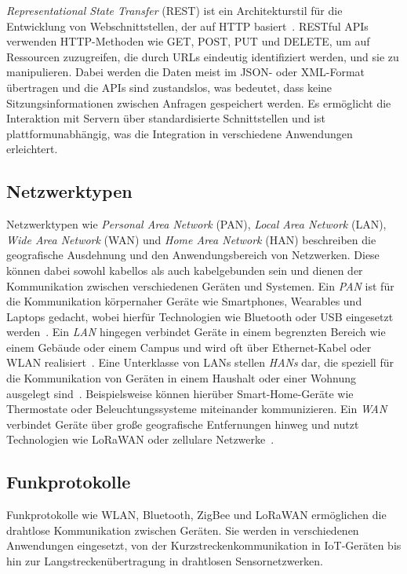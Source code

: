 \emph{Representational State Transfer} (REST) ist ein Architekturstil für die Entwicklung von Webschnittstellen, der auf HTTP basiert~\cite{REST}.
RESTful APIs verwenden HTTP-Methoden wie GET, POST, PUT und DELETE, um auf Ressourcen zuzugreifen, die durch URLs eindeutig identifiziert werden, und sie zu manipulieren.
Dabei werden die Daten meist im JSON- oder XML-Format übertragen und die APIs sind zustandslos, was bedeutet, dass keine Sitzungsinformationen zwischen Anfragen gespeichert werden.
Es ermöglicht die Interaktion mit Servern über standardisierte Schnittstellen und ist plattformunabhängig, was die Integration in verschiedene Anwendungen erleichtert.


\subsection*{Netzwerktypen}
Netzwerktypen wie \emph{Personal Area Network} (PAN), \emph{Local Area Network} (LAN), \emph{Wide Area Network} (WAN) und \emph{Home Area Network} (HAN) beschreiben die geografische Ausdehnung und den Anwendungsbereich von Netzwerken.
Diese können dabei sowohl kabellos als auch kabelgebunden sein und dienen der Kommunikation zwischen verschiedenen Geräten und Systemen.
Ein \emph{PAN} ist für die Kommunikation körpernaher Geräte wie Smartphones, Wearables und Laptops gedacht, wobei hierfür Technologien wie Bluetooth oder USB eingesetzt werden~\cite{PAN}.
Ein \emph{LAN} hingegen verbindet Geräte in einem begrenzten Bereich wie einem Gebäude oder einem Campus und wird oft über Ethernet-Kabel oder WLAN realisiert~\cite{LAN}.
Eine Unterklasse von LANs stellen \emph{HANs} dar, die speziell für die Kommunikation von Geräten in einem Haushalt oder einer Wohnung ausgelegt sind~\cite{HAN}.
Beispielsweise können hierüber Smart-Home-Geräte wie Thermostate oder Beleuchtungssysteme miteinander kommunizieren.
Ein \emph{WAN} verbindet Geräte über große geografische Entfernungen hinweg und nutzt Technologien wie LoRaWAN oder zellulare Netzwerke~\cite{WAN}.


\subsection*{Funkprotokolle}
Funkprotokolle wie WLAN, Bluetooth, ZigBee und LoRaWAN ermöglichen die drahtlose Kommunikation zwischen Geräten.
Sie werden in verschiedenen Anwendungen eingesetzt, von der Kurzstreckenkommunikation in IoT-Geräten bis hin zur Langstreckenübertragung in drahtlosen Sensornetzwerken.

